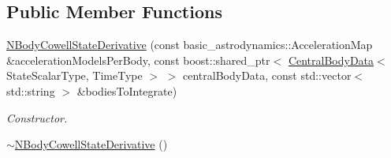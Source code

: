 \subsection*{Public Member Functions}
\begin{DoxyCompactItemize}
\item 
\hyperlink{classtudat_1_1propagators_1_1NBodyCowellStateDerivative_a7687e7501ad0e2353082f3498867f972}{N\+Body\+Cowell\+State\+Derivative} (const basic\+\_\+astrodynamics\+::\+Acceleration\+Map \&acceleration\+Models\+Per\+Body, const boost\+::shared\+\_\+ptr$<$ \hyperlink{classtudat_1_1propagators_1_1CentralBodyData}{Central\+Body\+Data}$<$ State\+Scalar\+Type, Time\+Type $>$ $>$ central\+Body\+Data, const std\+::vector$<$ std\+::string $>$ \&bodies\+To\+Integrate)
\begin{DoxyCompactList}\small\item\em Constructor. \end{DoxyCompactList}\item 
\hyperlink{classtudat_1_1propagators_1_1NBodyCowellStateDerivative_a96d7e00e616b51750f0f366da21baf38}{$\sim$\+N\+Body\+Cowell\+State\+Derivative} ()\hypertarget{classtudat_1_1propagators_1_1NBodyCowellStateDerivative_a96d7e00e616b51750f0f366da21baf38}{}\label{classtudat_1_1propagators_1_1NBodyCowellStateDerivative_a96d7e00e616b51750f0f366da21baf38}


\end{DoxyCompactItemize}

